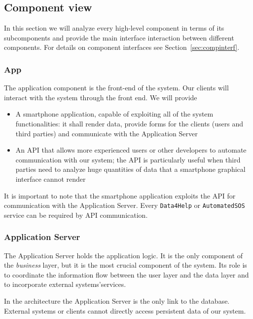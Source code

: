 \documentclass[../DD0.tex]{subfiles}
\begin{document}

  \subsection{Component view}
  \label{sec:compview}

    In this section we will analyze every high-level component in terms of its subcomponents and provide the main interface interaction between different components. For details on component interfaces see Section~\ref{sec:compinterf}.

      \subsubsection{App}

        The application component is the front-end of the system. Our clients will interact with the system through the front end. We will provide
        \begin{itemize}
          \item A smartphone application, capable of exploiting all of the system functionalities: it shall render data, provide forms for the clients (users and third parties) and communicate with the Application Server
          \item An API that allows more experienced users or other developers to automate communication with our system; the API is particularly useful when third parties need to analyze huge quantities of data that a smartphone graphical interface cannot render
        \end{itemize}

        It is important to note that the smartphone application exploits the API for communication with the Application Server. Every \texttt{Data4Help} or \texttt{AutomatedSOS} service can be required by API communication.

      \subsubsection{Application Server}

        The Application Server holds the application logic. It is the only component of the \textit{business} layer, but it is the most crucial component of the system. Its role is to coordinate the information flow between the user layer and the data layer and to incorporate external systems'services.

        In the architecture the Application Server is the only link to the database. External systems or clients cannot directly access persistent data of our system.
\end{document}
